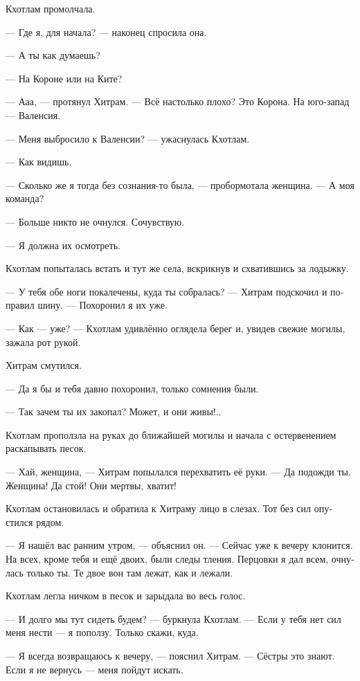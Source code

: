 \documentclass[a4paper,12pt,fleqn]{book}\usepackage{polyglossia}\setdefaultlanguage[babelshorthands=true]{russian}\setotherlanguage{english}\defaultfontfeatures{Ligatures=TeX,Mapping=tex-text}\usepackage{xcolor}\newcommand{\ml}[3]{#2}
\newcommand{\asterism}{\vspace{1em}{\centering\Large\bfseries$\ast~\ast~\ast$\par}\vspace{1em}}
\begin{document}
Кхотлам промолчала.

--- Где я, для начала? --- наконец спросила она.

--- А ты как думаешь?

--- На Короне или на Ките?

--- Ааа, --- протянул Хитрам.
--- Всё настолько плохо?
Это Корона.
На юго-запад --- Валенсия.

--- Меня выбросило к Валенсии? --- ужаснулась Кхотлам.

--- Как видишь.

--- Сколько же я тогда без сознания-то была, --- пробормотала женщина.
--- А моя команда?

--- Больше никто не очнулся.
Сочувствую.

--- Я должна их осмотреть.

Кхотлам попыталась встать и тут же села, вскрикнув и схватившись за лодыжку.

--- У тебя обе ноги покалечены, куда ты собралась? --- Хитрам подскочил и поправил шину.
--- Похоронил я их уже.

--- Как --- уже? --- Кхотлам удивлённо оглядела берег и, увидев свежие могилы, зажала рот рукой.

Хитрам смутился.

--- Да я бы и тебя давно похоронил, только сомнения были.

--- Так зачем ты их закопал?
Может, и они живы!..

Кхотлам проползла на руках до ближайшей могилы и начала с остервенением раскапывать песок.

--- Хай, женщина, --- Хитрам попылался перехватить её руки.
--- Да подожди ты.
Женщина!
Да стой!
Они мертвы, хватит!

Кхотлам остановилась и обратила к Хитраму лицо в слезах.
Тот без сил опустился рядом.

--- Я нашёл вас ранним утром, --- объяснил он.
--- Сейчас уже к вечеру клонится.
На всех, кроме тебя и ещё двоих, были следы тления.
Перцовки я дал всем, очнулась только ты.
Те двое вон там лежат, как и лежали.

Кхотлам легла ничком в песок и зарыдала во весь голос.

\asterism

--- И долго мы тут сидеть будем? --- буркнула Кхотлам.
--- Если у тебя нет сил меня нести --- я поползу.
Только скажи, куда.

--- Я всегда возвращаюсь к вечеру, --- пояснил Хитрам.
--- Сёстры это знают.
Если я не вернусь --- меня пойдут искать.
\end{document}

